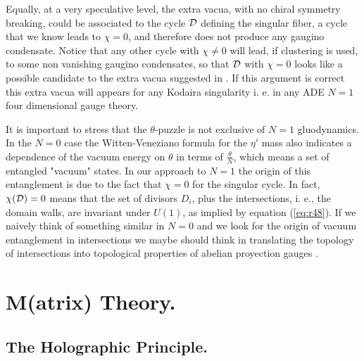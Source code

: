   
Equally, at a very speculative level, the extra vacua, with no
chiral symmetry breaking, could be associated to the cycle ${\cal
D}$ defining the singular fiber, a cycle that we know leads to
$\chi=0$, and therefore does not produce any gaugino condensate.
Notice that any other cycle with $\chi \neq 0$ will lead, if
clustering is used, to some non vanishing gaugino condensates, so
that ${\cal D}$ with $\chi=0$ looks like a possible
candidate to the extra vacua suggested in \cite{KS}. If this
argument is correct this extra vacua will appears for any Kodaira
singularity i. e. in any ADE $N=1$ four dimensional gauge theory.

It is important to stress that the $\theta$-puzzle is not
exclusive of $N=1$ gluodynamics. In the $N=0$ case the
Witten-Veneziano formula \cite{Wi,Ve} for the $\eta'$ mass 
also indicates a dependence of the vacuum 
energy on $\theta$ in terms of $\frac {\theta}{N}$, 
which means a set of entangled "vacuum" states. 
In our approach to $N=1$ the origin of this entanglement is due to the fact 
that $\chi=0$ for the singular cycle. In fact, $\chi({\cal D})=0$ means that the set 
of divisors $D_i$, plus the intersections, i. e., the domain walls, are 
invariant under $U(1)$, as implied by equation (\ref{eq:r48}). If 
we naively think of something similar in $N=0$
and we look for the origin of vacuum entanglement in intersections we maybe should think in
translating the topology of intersections into topological properties 
of abelian proyection gauges \cite{tHap}. 








\newpage





\appendix


\section{M(atrix) Theory.}

\subsection{The Holographic Principle.}

